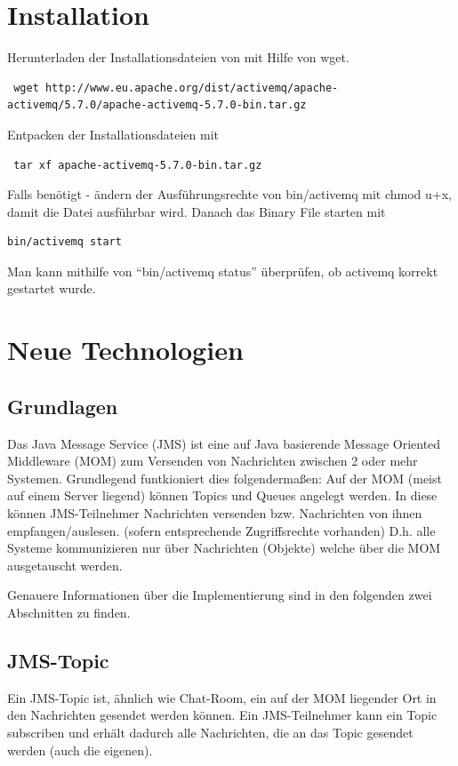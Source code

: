 \documentclass[11pt, a4paper]{article}
\begin{document}
\section{Installation}
Herunterladen der Installationsdateien von \cite{activemqdownload} mit Hilfe von wget.
\begin{lstlisting}
 wget http://www.eu.apache.org/dist/activemq/apache-activemq/5.7.0/apache-activemq-5.7.0-bin.tar.gz
\end{lstlisting}
Entpacken der Installationsdateien mit
\begin{lstlisting}
 tar xf apache-activemq-5.7.0-bin.tar.gz
\end{lstlisting}
Falls benötigt - ändern der Ausführungsrechte von bin/activemq mit chmod u+x, damit die Datei ausführbar wird.
Danach das Binary File starten mit
\begin{lstlisting}
bin/activemq start
\end{lstlisting}

Man kann mithilfe von ``bin/activemq status'' überprüfen, ob activemq korrekt gestartet wurde.

\newpage

\section{Neue Technologien}
\subsection{Grundlagen}
Das Java Message Service (JMS) \cite{activemqtut1} ist eine auf Java basierende Message Oriented Middleware (MOM) zum Versenden von Nachrichten zwischen 2 oder mehr Systemen.
Grundlegend funtkioniert dies folgendermaßen:
Auf der MOM (meist auf einem Server liegend) können Topics und Queues angelegt werden.
In diese können JMS-Teilnehmer Nachrichten versenden bzw. Nachrichten von ihnen empfangen/auslesen. (sofern entsprechende Zugriffsrechte vorhanden)
D.h. alle Systeme kommunizieren nur über Nachrichten (Objekte) welche über die MOM ausgetauscht werden.

Genauere Informationen über die Implementierung sind in den folgenden zwei Abschnitten zu finden.

\subsection{JMS-Topic}
Ein JMS-Topic ist, ähnlich wie Chat-Room, ein auf der MOM liegender Ort in den Nachrichten gesendet werden können. Ein JMS-Teilnehmer kann ein Topic
subscriben und erhält dadurch alle Nachrichten, die an das Topic gesendet werden (auch die eigenen).
\end{document}
